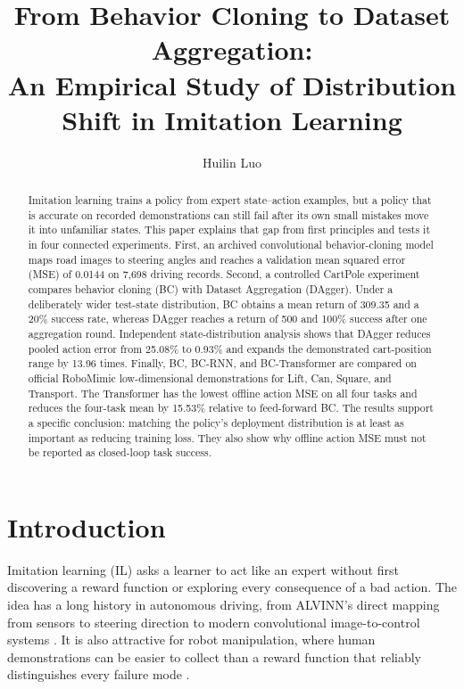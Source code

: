 \documentclass[10pt]{article}
\title{\textbf{From Behavior Cloning to Dataset Aggregation:}\\
An Empirical Study of Distribution Shift in Imitation Learning}
\author{Huilin Luo}
\date{}
\begin{document}
\maketitle

\begin{abstract}
Imitation learning trains a policy from expert state--action examples, but a
policy that is accurate on recorded demonstrations can still fail after its own
small mistakes move it into unfamiliar states. This paper explains that gap from
first principles and tests it in four connected experiments. First, an archived
convolutional behavior-cloning model maps road images to steering angles and
reaches a validation mean squared error (MSE) of 0.0144 on 7,698 driving records.
Second, a controlled CartPole experiment compares behavior cloning (BC) with
Dataset Aggregation (DAgger). Under a deliberately wider test-state
distribution, BC obtains a mean return of 309.35 and a 20\% success rate, whereas
DAgger reaches a return of 500 and 100\% success after one aggregation round.
Independent state-distribution analysis shows that DAgger reduces pooled action
error from 25.08\% to 0.93\% and expands the demonstrated cart-position range by
13.96 times. Finally, BC, BC-RNN, and BC-Transformer are compared on official
RoboMimic low-dimensional demonstrations for Lift, Can, Square, and Transport.
The Transformer has the lowest offline action MSE on all four tasks and reduces
the four-task mean by 15.53\% relative to feed-forward BC. The results support a
specific conclusion: matching the policy's deployment distribution is at least
as important as reducing training loss. They also show why offline action MSE
must not be reported as closed-loop task success.
\end{abstract}

\section{Introduction}

Imitation learning (IL) asks a learner to act like an expert without first
discovering a reward function or exploring every consequence of a bad action.
The idea has a long history in autonomous driving, from ALVINN's direct mapping
from sensors to steering direction \citep{pomerleau1989alvinn} to modern
convolutional image-to-control systems \citep{bojarski2016end}. It is also
attractive for robot manipulation, where human demonstrations can be easier to
collect than a reward function that reliably distinguishes every failure mode
\citep{mandlekar2022robomimic}.
\end{document}
